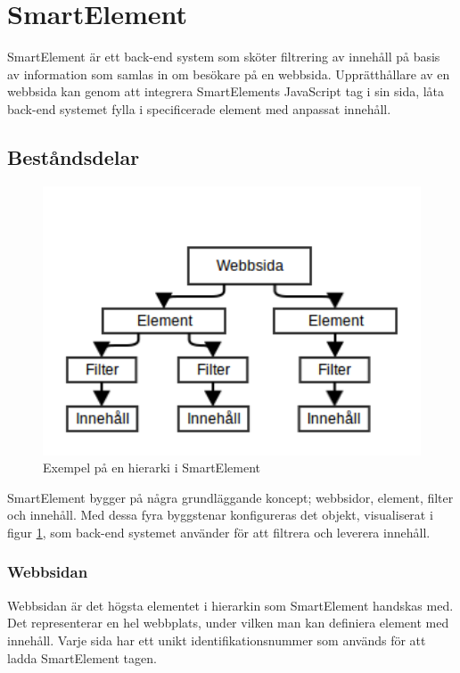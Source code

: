 \section{SmartElement}

SmartElement är ett back-end system som sköter filtrering av innehåll på basis av information som samlas in om besökare på en webbsida. Upprätthållare av en webbsida kan genom att integrera SmartElements JavaScript tag i sin sida, låta back-end systemet fylla i specificerade element med anpassat innehåll.

\subsection{Beståndsdelar}

\begin{figure}[h!]
\centering
\includegraphics[width=120mm]{assets/images/smelementdatamodelabstract.png}
\caption{Exempel på en hierarki i SmartElement}
\label{abstractstructure}
\end{figure}

SmartElement bygger på några grundläggande koncept; webbsidor, element, filter och innehåll. Med dessa fyra byggstenar konfigureras det objekt, visualiserat i figur \ref{abstractstructure}, som back-end systemet använder för att filtrera och leverera innehåll.

\subsubsection{Webbsidan}

Webbsidan är det högsta elementet i hierarkin som SmartElement handskas med. Det representerar en hel webbplats, under vilken man kan definiera element med innehåll. Varje sida har ett unikt identifikationsnummer som används för att ladda SmartElement tagen.

